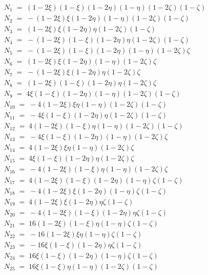 \documentclass{article}
\begin{document}
\begin{eqnarray}   
	N_{1} \;=\; (1-2\xi)(1-\xi)(1-2\eta)(1-\eta)(1-2\zeta)(1-\zeta) \\
	N_{2} \;=\; -(1-2\xi)\xi(1-2\eta)(1-\eta)(1-2\zeta)(1-\zeta) \\
	N_{3} \;=\; (1-2\xi)\xi(1-2\eta)\eta(1-2\zeta)(1-\zeta) \\
	N_{4} \;=\; -(1-2\xi)(1-\xi)(1-2\eta)\eta(1-2\zeta)(1-\zeta) \\
	N_{5} \;=\; -(1-2\xi)(1-\xi)(1-2\eta)(1-\eta)(1-2\zeta)\zeta \\
	N_{6} \;=\; (1-2\xi)\xi(1-2\eta)(1-\eta)(1-2\zeta)\zeta \\
	N_{7} \;=\; -(1-2\xi)\xi(1-2\eta)\eta(1-2\zeta)\zeta \\
	N_{8} \;=\; (1-2\xi)(1-\xi)(1-2\eta)\eta(1-2\zeta)\zeta \\
	N_{9} \;=\; 4\xi(1-\xi)(1-2\eta)(1-\eta)(1-2\zeta)(1-\zeta) \\
	N_{10} \;=\; -4(1-2\xi)\xi\eta(1-\eta)(1-2\zeta)(1-\zeta) \\
	N_{11} \;=\; -4\xi(1-\xi)(1-2\eta)\eta(1-2\zeta)(1-\zeta) \\
	N_{12} \;=\; 4(1-2\xi)(1-\xi)\eta(1-\eta)(1-2\zeta)(1-\zeta) \\
	N_{13} \;=\; -4\xi(1-\xi)(1-2\eta)(1-\eta)(1-2\zeta)\zeta \\
	N_{14} \;=\; 4(1-2\xi)\xi\eta(1-\eta)(1-2\zeta)\zeta \\ 
	N_{15} \;=\; 4\xi(1-\xi)(1-2\eta)\eta(1-2\zeta)\zeta \\
	N_{16} \;=\; -4(1-2\xi)(1-\xi)\eta(1-\eta)(1-2\zeta)\zeta \\
	N_{17} \;=\; 4(1-2\xi)(1-\xi)(1-2\eta)(1-\eta)\zeta(1-\zeta) \\
	N_{18} \;=\; -4(1-2\xi)\xi(1-2\eta)(1-\eta)\zeta(1-\zeta) \\
	N_{19} \;=\; 4(1-2\xi)\xi(1-2\eta)\eta\zeta(1-\zeta) \\
	N_{20} \;=\; -4(1-2\xi)(1-\xi)(1-2\eta)\eta\zeta(1-\zeta) \\
	N_{21} \;=\; 16(1-2\xi)(1-\xi)\eta(1-\eta)\zeta(1-\zeta) \\
	N_{22} \;=\; -16(1-2\xi)\xi\eta(1-\eta)\zeta(1-\zeta) \\
	N_{23} \;=\; -16\xi(1-\xi)(1-2\eta)\eta\zeta(1-\zeta) \\
	N_{24} \;=\; 16\xi(1-\xi)(1-2\eta)(1-\eta)\zeta(1-\zeta) \\
	N_{25} \;=\; 16\xi(1-\xi)\eta(1-\eta)(1-2\zeta)(1-\zeta) \\
 \end{eqnarray}
\end{document}
